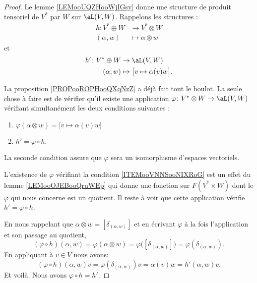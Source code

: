 \begin{proof}
	Le lemme \ref{LEMooUQZHooWjIGsy} donne une structure de produit tensoriel de \( V^*\) par \( W\) sur \( \aL(V,W)\). Rappelons les structures :
	\begin{equation}
		\begin{aligned}
			h\colon V^*\oplus W & \to V^*\otimes W        \\
			(\alpha,w)          & \mapsto \alpha\otimes w
		\end{aligned}
	\end{equation}
	et
	\begin{equation}
		\begin{aligned}
			h'\colon V^*\oplus W & \to \aL(V,W)                             \\
			(\alpha,w)           & \mapsto \big[ v\mapsto \alpha(v)w \big].
		\end{aligned}
	\end{equation}

	La proposition \ref{PROPooROPHooQXqNzZ} a déjà fait tout le boulot. La seule chose à faire est de vérifier qu'il existe une application \( \varphi\colon V^*\otimes W\to \aL(V,W)\) vérifiant simultanément les deux conditions suivantes :
	\begin{enumerate}
		\item       \label{ITEMooVNNSooNIXRoG}
		      \( \varphi(\alpha\otimes w)=\big[ v\mapsto \alpha(v)w \big]\)
		\item
		      \( h'=\varphi\circ h\).
	\end{enumerate}
	La seconde condition assure que \( \varphi\) sera un isomorphisme d'espaces vectoriels.

	L'existence de \( \varphi\) vérifiant la condition \ref{ITEMooVNNSooNIXRoG} est un effet du lemme \ref{LEMooOJEBooQruWEp} qui donne une fonction sur \( F(V^*\times W)\) dont le \( \varphi\) qui nous concerne est un quotient. Il reste à voir que cette application vérifie \( h'=\varphi\circ h\).

	En nous rappelant que \( \alpha\otimes w=[\delta_{(\alpha,w)}]\) et en écrivant \( \varphi\) à la fois l'application et son passage au quotient,
	\begin{equation}
		(\varphi\circ h)(\alpha,w)=\varphi(\alpha\otimes w)=\varphi\big( [\delta_{(\alpha,w)}] \big)=\varphi(\delta_{(\alpha,w)}).
	\end{equation}
	En appliquant à \( v\in V\) nous avons:
	\begin{equation}
		(\varphi\circ h)(\alpha,w)v=\varphi(\delta_{(\alpha,w)})v=\alpha(v)w=h'(\alpha,w)v.
	\end{equation}
	Et voilà. Nous avons \( \varphi\circ h=h'\).
\end{proof}

